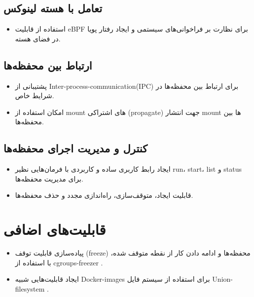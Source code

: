 \documentclass[10pt,a4paper]{article}
\begin{document}
\subsection{تعامل با هسته لینوکس}

\begin{itemize}
	\item 
	استفاده از قابلیت eBPF برای نظارت بر فراخوانی‌های سیستمی و ایجاد رفتار پویا در فضای هسته.
\end{itemize}


\subsection{ارتباط بین محفظه‌ها}

\begin{itemize}
	\item 
	پشتیبانی از
	 Inter-process-communication(IPC)
	 برای ارتباط بین محفظه‌ها در شرایط خاص.
	
	\item 
	امکان استفاده از mount های اشتراکی (propagate) جهت انتشار mount ها بین محفظه‌ها.
\end{itemize}

\pagebreak

\subsection{کنترل و مدیریت اجرای محفظه‌ها}

\begin{itemize}
	\item 
	ایجاد رابط کاربری ساده و کاربردی با فرمان‌هایی نظیر run، start، list و status برای مدیریت محفظه‌ها.
	\item 
	قابلیت ایجاد، متوقف‌سازی، راه‌اندازی مجدد و حذف محفظه‌ها.
\end{itemize}



\section{قابلیت‌های اضافی}

\begin{itemize}
	\item
	 پیاده‌سازی قابلیت توقف (freeze) محفظه‌ها و ادامه دادن کار از نقطه متوقف شده، با استفاده از cgroups-freezer .
	
	\item 
	ایجاد قابلیت‌هایی شبیه Docker-images برای استفاده از سیستم فایل Union-filesystem .
\end{itemize}
\end{document}
